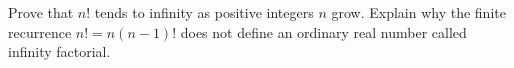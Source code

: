 Prove that $ n!$ tends to infinity as positive integers $ n $ grow. Explain why the finite recurrence $ n!=n(n-1)!$ does not define an ordinary real number called infinity factorial.
